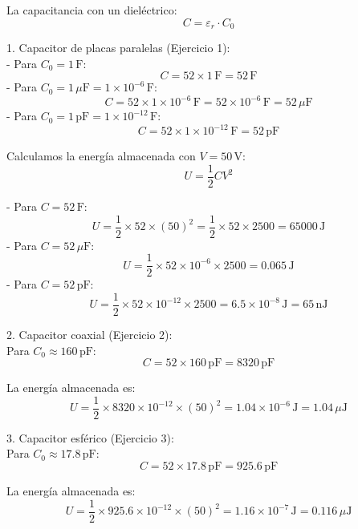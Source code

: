 \documentclass[answers]{exam} %
\begin{document}
\begin{questions}
     
        
        La capacitancia con un dieléctrico:
        \[
        \boxed{C = \varepsilon_r \cdot C_0}
        \]
        
        1. Capacitor de placas paralelas (Ejercicio 1):\\
        - Para \( C_0 = 1 \, \text{F} \):
          \[
          C = 52 \times 1 \, \text{F} = 52 \, \text{F}
          \]
        - Para \( C_0 = 1 \, \mu \text{F} = 1 \times 10^{-6} \, \text{F} \):
          \[
          C = 52 \times 1 \times 10^{-6} \, \text{F} = 52 \times 10^{-6} \, \text{F} = 52 \, \mu \text{F}
          \]
        - Para \( C_0 = 1 \, \text{pF} = 1 \times 10^{-12} \, \text{F} \):
          \[
          C = 52 \times 1 \times 10^{-12} \, \text{F} = 52 \, \text{pF}
          \]
        
        Calculamos la energía almacenada con \( V = 50 \, \text{V} \):
        \[
        U = \frac{1}{2} C V^2
        \]
        
        - Para \( C = 52 \, \text{F} \):
          \[
          U = \frac{1}{2} \times 52 \times (50)^2 = \frac{1}{2} \times 52 \times 2500 = 65000 \, \text{J}
          \]
        - Para \( C = 52 \, \mu \text{F} \):
          \[
          U = \frac{1}{2} \times 52 \times 10^{-6} \times 2500 = 0.065 \, \text{J}
          \]
        - Para \( C = 52 \, \text{pF} \):
          \[
          U = \frac{1}{2} \times 52 \times 10^{-12} \times 2500 = 6.5 \times 10^{-8} \, \text{J} = 65 \, \text{nJ}
          \]
        
        2. Capacitor coaxial (Ejercicio 2):\\
        Para \( C_0 \approx 160 \, \text{pF} \):
        \[
        C = 52 \times 160 \, \text{pF} = 8320 \, \text{pF}
        \]
        
        La energía almacenada es:
        \[
        U = \frac{1}{2} \times 8320 \times 10^{-12} \times (50)^2 = 1.04 \times 10^{-6} \, \text{J} = 1.04 \, \mu \text{J}
        \]
        
        3. Capacitor esférico (Ejercicio 3):\\
        Para \( C_0 \approx 17.8 \, \text{pF} \):
        \[
        C = 52 \times 17.8 \, \text{pF} = 925.6 \, \text{pF}
        \]
        
        La energía almacenada es:
        \[
        U = \frac{1}{2} \times 925.6 \times 10^{-12} \times (50)^2 = 1.16 \times 10^{-7} \, \text{J} = 0.116 \, \mu \text{J}
        \]
        
   
       

\end{questions}
\end{document}
